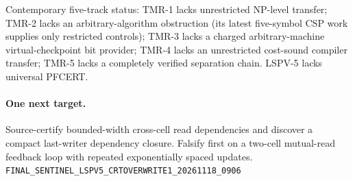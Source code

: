 \documentclass[11pt]{article}
\begin{document}
Contemporary five-track status: TMR-1 lacks unrestricted NP-level transfer; TMR-2 lacks an arbitrary-algorithm obstruction (its latest five-symbol CSP work supplies only restricted controls); TMR-3 lacks a charged arbitrary-machine virtual-checkpoint bit provider; TMR-4 lacks an unrestricted cost-sound compiler transfer; TMR-5 lacks a completely verified separation chain. LSPV-5 lacks universal PFCERT.

\paragraph{One next target.} Source-certify bounded-width cross-cell read dependencies and discover a compact last-writer dependency closure. Falsify first on a two-cell mutual-read feedback loop with repeated exponentially spaced updates.
\noindent\texttt{FINAL\_SENTINEL\_LSPV5\_CRTOVERWRITE1\_20261118\_0906}
\end{document}
